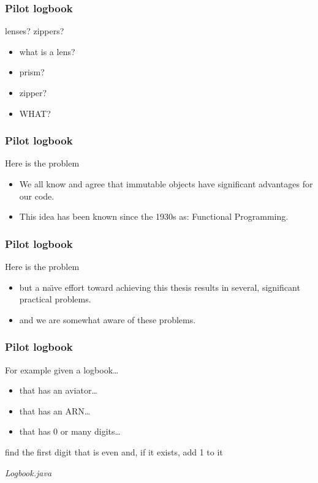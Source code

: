 \begin{frame}
\frametitle{Pilot logbook}
\begin{block}{lenses? zippers?}
\begin{itemize}
\item<1-> what is a lens?
\item<1-> prism?
\item<1-> zipper?
\item<1-> WHAT?
\end{itemize}
\end{block}
\end{frame}

\begin{frame}
\frametitle{Pilot logbook}
\begin{block}{Here is the problem}
\begin{itemize}
\item<1-> We all know and agree that immutable objects have significant advantages for our code.
\item<1-> This idea has been known since the 1930s as: Functional Programming.
\end{itemize}
\end{block}
\end{frame}

\begin{frame}
\frametitle{Pilot logbook}
\begin{block}{Here is the problem}
\begin{itemize}
\item<1-> but a na{\"\i}ve effort toward achieving this thesis results in several, significant practical problems.
\item<1-> and we are somewhat aware of these problems.
\end{itemize}
\end{block}
\end{frame}

\begin{frame}
\frametitle{Pilot logbook}
\begin{block}{For example}
given a logbook\ldots
\begin{itemize}
\item that has an aviator\ldots
\item that has an ARN\ldots
\item that has 0 or many digits\ldots
\end{itemize}
find the first digit that is even and, if it exists, add 1 to it
\end{block}
\emph{Logbook.java}
\end{frame}

